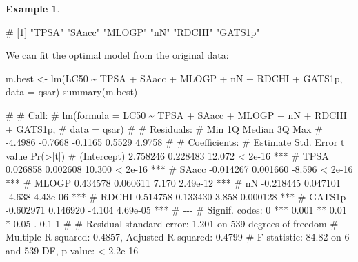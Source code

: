 \documentclass[
  a4paper,
]{article}
\newenvironment{Shaded}{\begin{snugshade}}{\end{snugshade}}
\newcommand{\AttributeTok}[1]{\textcolor[rgb]{0.77,0.63,0.00}{#1}}
\newcommand{\FunctionTok}[1]{\textcolor[rgb]{0.00,0.00,0.00}{#1}}
\newcommand{\NormalTok}[1]{#1}
\newcommand{\OtherTok}[1]{\textcolor[rgb]{0.56,0.35,0.01}{#1}}
\newcommand{\SpecialCharTok}[1]{\textcolor[rgb]{0.00,0.00,0.00}{#1}}
\theoremstyle{definition}
\theoremstyle{definition}
\newtheorem{example}{Example}[section]
\theoremstyle{definition}
\theoremstyle{definition}
\theoremstyle{remark}
\begin{document}
\begin{example}
\begin{Shaded}
\begin{Highlighting}[]
\NormalTok{\# [1] "TPSA"   "SAacc"  "MLOGP"  "nN"     "RDCHI"  "GATS1p"}
\end{Highlighting}
\end{Shaded}

We can fit the optimal model from the original data:

\begin{Shaded}
\begin{Highlighting}[]
\NormalTok{m.best }\OtherTok{\textless{}{-}} \FunctionTok{lm}\NormalTok{(LC50 }\SpecialCharTok{\textasciitilde{}}\NormalTok{ TPSA }\SpecialCharTok{+}\NormalTok{ SAacc }\SpecialCharTok{+}\NormalTok{ MLOGP }\SpecialCharTok{+}\NormalTok{ nN }\SpecialCharTok{+}\NormalTok{ RDCHI }\SpecialCharTok{+}\NormalTok{ GATS1p,}
             \AttributeTok{data =}\NormalTok{ qsar)}
\FunctionTok{summary}\NormalTok{(m.best)}
\end{Highlighting}
\end{Shaded}

\begin{Shaded}
\begin{Highlighting}[]
\NormalTok{\# }
\NormalTok{\# Call:}
\NormalTok{\# lm(formula = LC50 \textasciitilde{} TPSA + SAacc + MLOGP + nN + RDCHI + GATS1p, }
\NormalTok{\#     data = qsar)}
\NormalTok{\# }
\NormalTok{\# Residuals:}
\NormalTok{\#     Min      1Q  Median      3Q     Max }
\NormalTok{\# {-}4.4986 {-}0.7668 {-}0.1165  0.5529  4.9758 }
\NormalTok{\# }
\NormalTok{\# Coefficients:}
\NormalTok{\#              Estimate Std. Error t value Pr(\textgreater{}|t|)    }
\NormalTok{\# (Intercept)  2.758246   0.228483  12.072  \textless{} 2e{-}16 ***}
\NormalTok{\# TPSA         0.026858   0.002608  10.300  \textless{} 2e{-}16 ***}
\NormalTok{\# SAacc       {-}0.014267   0.001660  {-}8.596  \textless{} 2e{-}16 ***}
\NormalTok{\# MLOGP        0.434578   0.060611   7.170 2.49e{-}12 ***}
\NormalTok{\# nN          {-}0.218445   0.047101  {-}4.638 4.43e{-}06 ***}
\NormalTok{\# RDCHI        0.514758   0.133430   3.858 0.000128 ***}
\NormalTok{\# GATS1p      {-}0.602971   0.146920  {-}4.104 4.69e{-}05 ***}
\NormalTok{\# {-}{-}{-}}
\NormalTok{\# Signif. codes:  0 \textquotesingle{}***\textquotesingle{} 0.001 \textquotesingle{}**\textquotesingle{} 0.01 \textquotesingle{}*\textquotesingle{} 0.05 \textquotesingle{}.\textquotesingle{} 0.1 \textquotesingle{} \textquotesingle{} 1}
\NormalTok{\# }
\NormalTok{\# Residual standard error: 1.201 on 539 degrees of freedom}
\NormalTok{\# Multiple R{-}squared:  0.4857,  Adjusted R{-}squared:  0.4799 }
\NormalTok{\# F{-}statistic: 84.82 on 6 and 539 DF,  p{-}value: \textless{} 2.2e{-}16}
\end{Highlighting}
\end{Shaded}


\end{example}
\end{document}
